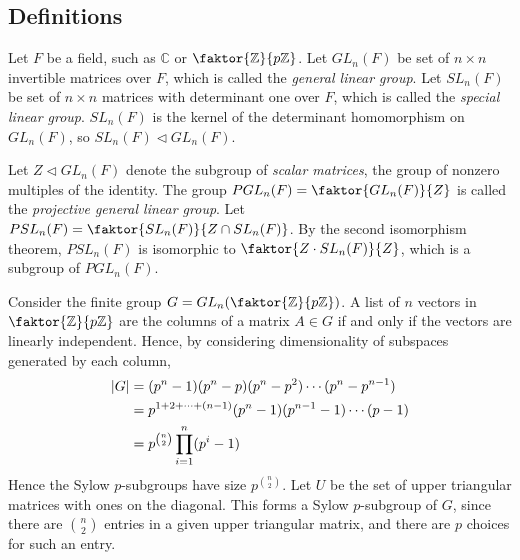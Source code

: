 \subsection{Definitions}
\begin{definition}
	Let \( F \) be a field, such as \( \mathbb C \) or \( \faktor{\mathbb Z}{p \mathbb Z} \).
	Let \( GL_n(F) \) be set of \( n \times n \) invertible matrices over \( F \), which is called the \textit{general linear group}.
	Let \( SL_n(F) \) be set of \( n \times n \) matrices with determinant one over \( F \), which is called the \textit{special linear group}.
	\( SL_n(F) \) is the kernel of the determinant homomorphism on \( GL_n(F) \), so \( SL_n(F) \vartriangleleft GL_n(F) \).

	Let \( Z \vartriangleleft GL_n(F) \) denote the subgroup of \textit{scalar matrices}, the group of nonzero multiples of the identity.
	The group \( PGL_n(F) = \faktor{GL_n(F)}{Z} \) is called the \textit{projective general linear group}.
	Let \( PSL_n(F) = \faktor{SL_n(F)}{Z \cap SL_n(F)} \).
	By the second isomorphism theorem, \( PSL_n(F) \) is isomorphic to \( \faktor{Z \cdot SL_n(F)}{Z} \), which is a subgroup of \( PGL_n(F) \).
\end{definition}
\begin{example}
	Consider the finite group \( G = GL_n\qty(\faktor{\mathbb Z}{p\mathbb Z}) \).
	A list of \( n \) vectors in \( \faktor{\mathbb Z}{p\mathbb Z} \) are the columns of a matrix \( A \in G \) if and only if the vectors are linearly independent.
	Hence, by considering dimensionality of subspaces generated by each column,
	\begin{align*}
		\abs{G} & = (p^n - 1)(p^n - p)(p^n - p^2) \cdots (p^n - p^{n-1})      \\
		        & = p^{1+2+\dots+(n-1)} (p^n - 1)(p^{n-1} - 1) \cdots (p - 1) \\
		        & = p^{\binom{n}{2}} \prod_{i=1}^n (p^i - 1)
	\end{align*}
	Hence the Sylow \( p \)-subgroups have size \( p^{\binom{n}{2}} \).
	Let \( U \) be the set of upper triangular matrices with ones on the diagonal.
	This forms a Sylow \( p \)-subgroup of \( G \), since there are \( \binom{n}{2} \) entries in a given upper triangular matrix, and there are \( p \) choices for such an entry.
\end{example}

